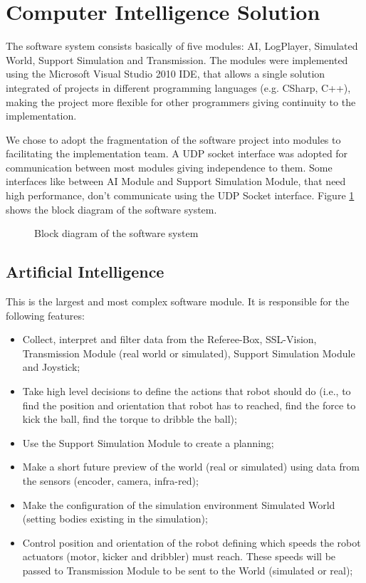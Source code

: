 \section{Computer Intelligence Solution}
	The software system consists basically of five modules: AI, LogPlayer, Simulated World,
Support Simulation and Transmission. The modules were implemented using the Microsoft Visual
Studio 2010 IDE, that allows a single solution integrated of projects in different programming
languages (e.g. CSharp, C++), making the project more flexible for other programmers giving
continuity to the implementation.

	We chose to adopt the fragmentation of the software project into modules to facilitating
the implementation team. A UDP socket interface was adopted for communication between most modules
giving independence to them. Some interfaces like between AI Module and Support Simulation Module,
that need high performance, don't communicate using the UDP Socket interface. Figure \ref{fluxogramaSoftware}
shows the block diagram of the software system.

\begin{figure}[thpb]
     \centering
     \caption{Block diagram of the software system}
     \label{fluxogramaSoftware}
\end{figure}

\subsection{Artificial Intelligence}
	This is the largest and most complex software module. It is responsible for the following features:
\begin{itemize}
\item Collect, interpret and filter data from the Referee-Box, SSL-Vision, Transmission Module (real world or simulated), Support Simulation Module and Joystick;
\item Take high level decisions to define the actions that robot should do (i.e., to find the position
and orientation that robot has to reached, find the force to kick the ball, find the torque to dribble the ball);
\item Use the Support Simulation Module to create a planning;
\item Make a short future preview of the world (real or simulated) using data from the sensors (encoder, camera, infra-red);
\item Make the configuration of the simulation environment Simulated World (setting bodies existing in the simulation);
\item Control position and orientation of the robot defining which speeds the robot actuators (motor,
kicker and dribbler) must reach. These speeds will be passed to Transmission Module to be sent to the World (simulated or real);
\end{itemize}

